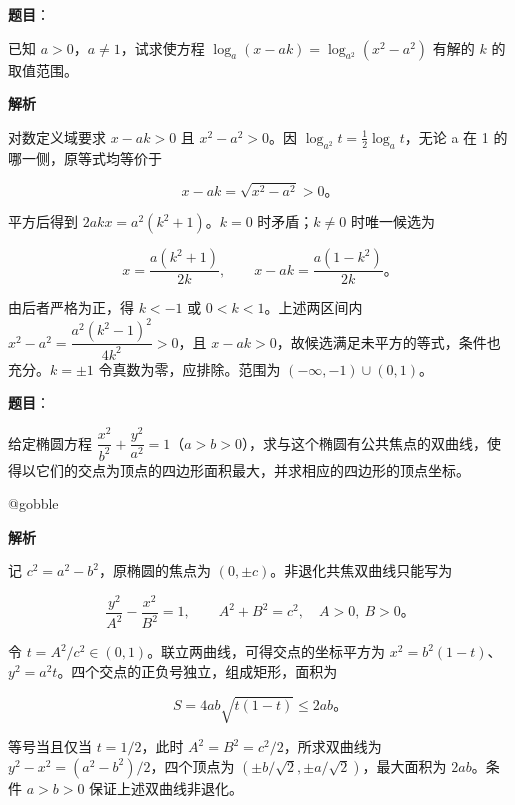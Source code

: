 \begin{answer}

\textbf{题目}：

已知 $a>0$，$a\ne1$，试求使方程 $\log_a(x-ak)=\log_{a^2}(x^2-a^2)$ 有解的 $k$ 的取值范围。

\textbf{解析}

对数定义域要求 $x-ak>0$ 且 $x^2-a^2>0$。因 $\log_{a^2}t=\tfrac12\log_at$，无论 a 在 1 的哪一侧，原等式均等价于

\nopagebreak[4]
\[
x-ak=\sqrt{x^2-a^2}>0\text{。}
\]

平方后得到 $2akx=a^2(k^2+1)$。$k=0$ 时矛盾；$k\ne0$ 时唯一候选为

\nopagebreak[4]
\[
x=\frac{a(k^2+1)}{2k},\qquad x-ak=\frac{a(1-k^2)}{2k}\text{。}
\]

由后者严格为正，得 $k<-1$ 或 $0<k<1$。上述两区间内 $x^2-a^2=\dfrac{a^2(k^2-1)^2}{4k^2}>0$，且 $x-ak>0$，故候选满足未平方的等式，条件也充分。$k=\pm1$ 令真数为零，应排除。范围为 $(-\infty,-1)\cup(0,1)$。


\end{answer}
\begin{answer}

\textbf{题目}：

给定椭圆方程 $\dfrac{x^2}{b^2}+\dfrac{y^2}{a^2}=1$（$a>b>0$），求与这个椭圆有公共焦点的双曲线，使得以它们的交点为顶点的四边形面积最大，并求相应的四边形的顶点坐标。

\long{}
\long\edef\gkcurrentedition{\gkheadR}
\ifx\gkcurrentedition\gkshortedition
\global\expandafter\let\expandafter\Needspace\csname @gobble\endcsname
\fi

\Needspace{4\baselineskip}
\textbf{解析}

\Needspace{5\baselineskip}
记 $c^2=a^2-b^2$，原椭圆的焦点为 $(0,\pm c)$。非退化共焦双曲线只能写为

\nopagebreak[4]
\[
\frac{y^2}{A^2}-\frac{x^2}{B^2}=1,\qquad A^2+B^2=c^2,\quad A>0,\ B>0\text{。}
\]

\Needspace{5\baselineskip}
令 $t=A^2/c^2\in(0,1)$。联立两曲线，可得交点的坐标平方为 $x^2=b^2(1-t)$、$y^2=a^2t$。四个交点的正负号独立，组成矩形，面积为

\nopagebreak[4]
\[
S=4ab\sqrt{t(1-t)}\le2ab\text{。}
\]

等号当且仅当 $t=1/2$，此时 $A^2=B^2=c^2/2$，所求双曲线为 $y^2-x^2=(a^2-b^2)/2$，四个顶点为 $(\pm b/\sqrt2,\pm a/\sqrt2)$，最大面积为 $2ab$。条件 $a>b>0$ 保证上述双曲线非退化。


\end{answer}